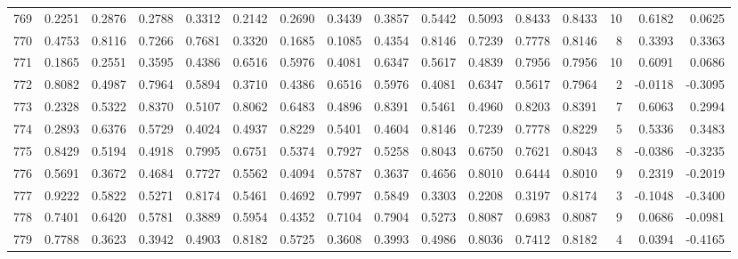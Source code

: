 \begin{tabular}{lrrrrrrrrrrrrrrr}
769 &      0.2251 &  0.2876 &  0.2788 &  0.3312 &  0.2142 &  0.2690 &  0.3439 &  0.3857 &  0.5442 &  0.5093 &   0.8433 &     0.8433 &     10 &                    0.6182 &                     0.0625 \\
770 &      0.4753 &  0.8116 &  0.7266 &  0.7681 &  0.3320 &  0.1685 &  0.1085 &  0.4354 &  0.8146 &  0.7239 &   0.7778 &     0.8146 &      8 &                    0.3393 &                     0.3363 \\
771 &      0.1865 &  0.2551 &  0.3595 &  0.4386 &  0.6516 &  0.5976 &  0.4081 &  0.6347 &  0.5617 &  0.4839 &   0.7956 &     0.7956 &     10 &                    0.6091 &                     0.0686 \\
772 &      0.8082 &  0.4987 &  0.7964 &  0.5894 &  0.3710 &  0.4386 &  0.6516 &  0.5976 &  0.4081 &  0.6347 &   0.5617 &     0.7964 &      2 &                   -0.0118 &                    -0.3095 \\
773 &      0.2328 &  0.5322 &  0.8370 &  0.5107 &  0.8062 &  0.6483 &  0.4896 &  0.8391 &  0.5461 &  0.4960 &   0.8203 &     0.8391 &      7 &                    0.6063 &                     0.2994 \\
774 &      0.2893 &  0.6376 &  0.5729 &  0.4024 &  0.4937 &  0.8229 &  0.5401 &  0.4604 &  0.8146 &  0.7239 &   0.7778 &     0.8229 &      5 &                    0.5336 &                     0.3483 \\
775 &      0.8429 &  0.5194 &  0.4918 &  0.7995 &  0.6751 &  0.5374 &  0.7927 &  0.5258 &  0.8043 &  0.6750 &   0.7621 &     0.8043 &      8 &                   -0.0386 &                    -0.3235 \\
776 &      0.5691 &  0.3672 &  0.4684 &  0.7727 &  0.5562 &  0.4094 &  0.5787 &  0.3637 &  0.4656 &  0.8010 &   0.6444 &     0.8010 &      9 &                    0.2319 &                    -0.2019 \\
777 &      0.9222 &  0.5822 &  0.5271 &  0.8174 &  0.5461 &  0.4692 &  0.7997 &  0.5849 &  0.3303 &  0.2208 &   0.3197 &     0.8174 &      3 &                   -0.1048 &                    -0.3400 \\
778 &      0.7401 &  0.6420 &  0.5781 &  0.3889 &  0.5954 &  0.4352 &  0.7104 &  0.7904 &  0.5273 &  0.8087 &   0.6983 &     0.8087 &      9 &                    0.0686 &                    -0.0981 \\
779 &      0.7788 &  0.3623 &  0.3942 &  0.4903 &  0.8182 &  0.5725 &  0.3608 &  0.3993 &  0.4986 &  0.8036 &   0.7412 &     0.8182 &      4 &                    0.0394 &                    -0.4165 \\

\end{tabular}
